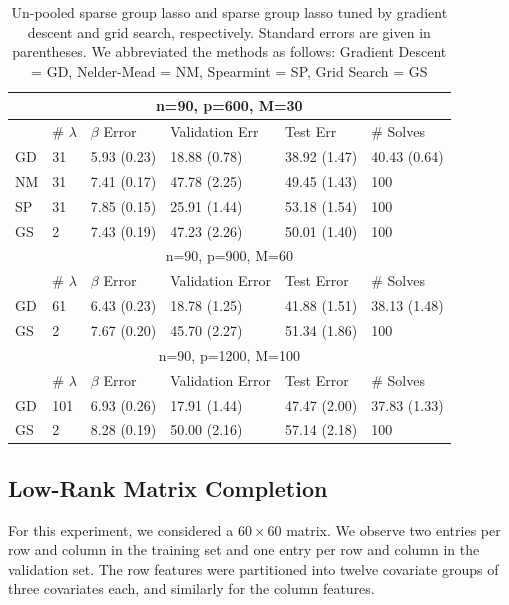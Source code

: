 \documentclass[12pt]{article}
\begin{document}
\begin{table}
\caption{\label{table:unpooled} Un-pooled sparse group lasso and sparse group lasso tuned by gradient descent and grid search, respectively. Standard errors are given in parentheses. We abbreviated the methods as follows: Gradient Descent = GD, Nelder-Mead = NM, Spearmint = SP, Grid Search = GS}
\centering
\begin{tabular}{| l | l | l | l | l | l | }
\hline
\multicolumn{6}{|c|}{n=90, p=600, M=30}\\
\hline
& \# $\lambda$ & $\beta$ Error & Validation Err & Test Err & \# Solves \\
\hline
GD & 31 & 5.93 (0.23)  & 18.88 (0.78) & 38.92 (1.47) & 40.43 (0.64) \\
\hline
NM & 31 & 7.41 (0.17) & 47.78 (2.25) & 49.45 (1.43) & 100\\
\hline
SP & 31 & 7.85 (0.15) &  25.91 (1.44) & 53.18 (1.54) & 100\\
\hline
GS & 2 & 7.43 (0.19) & 47.23 (2.26) & 50.01 (1.40) & 100 \\
\hline
\multicolumn{6}{|c|}{n=90, p=900, M=60}\\
\hline
& \# $\lambda$ & $\beta$ Error &  Validation Error & Test Error & \# Solves \\
\hline
GD & 61 & 6.43 (0.23) & 18.78 (1.25) & 41.88 (1.51) & 38.13 (1.48)\\
\hline
GS & 2 & 7.67 (0.20)  & 45.70 (2.27) & 51.34 (1.86) & 100 \\
\hline
\multicolumn{6}{|c|}{n=90, p=1200, M=100}\\
\hline
& \# $\lambda$ & $\beta$ Error & Validation Error & Test Error & \# Solves \\
\hline
GD & 101 & 6.93 (0.26) & 17.91 (1.44) & 47.47 (2.00) & 37.83 (1.33) \\
\hline
GS & 2 & 8.28 (0.19) & 50.00 (2.16) & 57.14 (2.18) & 100 \\
\hline
\end{tabular}
\end{table}

\subsection{Low-Rank Matrix Completion}\label{sec:simulation_matrix}
For this experiment, we considered a $60 \times 60$ matrix. We observe two entries per row and column in the training set and one entry per row and column in the validation set. The row features were partitioned into twelve covariate groups of three covariates each, and similarly for the column features.
\end{document}

